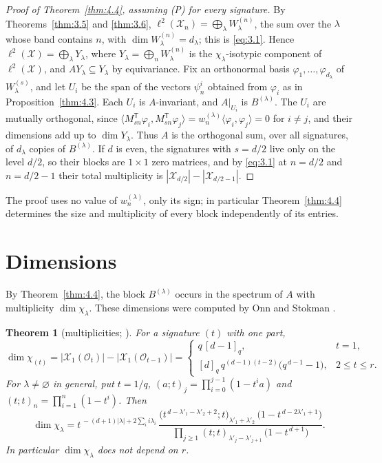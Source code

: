 \documentclass[11pt]{article}
\numberwithin{equation}{section}
\theoremstyle{plain}
\newtheorem{theorem}{Theorem}[section]
\theoremstyle{definition}
\begin{document}
\begin{proof}[Proof of Theorem~\ref{thm:4.4}, assuming (P) for every signature]
By Theorems~\ref{thm:3.5} and \ref{thm:3.6},
$\ell^2(\mathcal{X}_n)=\bigoplus_{\lambda}W^{(n)}_\lambda$, the sum over the $\lambda$ whose band
contains $n$, with $\dim W^{(n)}_\lambda=d_\lambda$; this is \eqref{eq:3.1}. Hence
$\ell^2(\mathcal{X})=\bigoplus_\lambda Y_\lambda$, where
$Y_\lambda=\bigoplus_nW^{(n)}_\lambda$ is the $\chi_\lambda$-isotypic component of
$\ell^2(\mathcal{X})$, and $AY_\lambda\subseteq Y_\lambda$ by equivariance. Fix an orthonormal
basis $\varphi_1,\dots,\varphi_{d_\lambda}$ of $W^{(s)}_\lambda$, and let $U_i$ be the
span of the vectors $\psi^i_n$ obtained from $\varphi_i$ as in Proposition~\ref{thm:4.3}. Each
$U_i$ is $A$-invariant, and $A|_{U_i}$ is $B^{(\lambda)}$. The $U_i$ are mutually
orthogonal, since
$\langle M_{sn}^{\mathsf T}\varphi_i,M_{sn}^{\mathsf T}\varphi_j\rangle=
w^{(\lambda)}_n\langle\varphi_i,\varphi_j\rangle=0$ for $i\ne j$, and their dimensions
add up to $\dim Y_\lambda$. Thus $A$ is the orthogonal sum, over all signatures, of
$d_\lambda$ copies of $B^{(\lambda)}$. If $d$ is even, the signatures with $s=d/2$ live
only on the level $d/2$, so their blocks are $1\times1$ zero matrices, and by \eqref{eq:3.1} at
$n=d/2$ and $n=d/2-1$ their total multiplicity is $|\mathcal{X}_{d/2}|-|\mathcal{X}_{d/2-1}|$.
\end{proof}

The proof uses no value of $w^{(\lambda)}_n$, only its sign; in particular Theorem~\ref{thm:4.4}
determines the size and multiplicity of every block independently of its entries.

\section{Dimensions}\label{sec:dims}

By Theorem~\ref{thm:4.4}, the block $B^{(\lambda)}$ occurs in the spectrum of $A$ with
multiplicity $\dim\chi_\lambda$. These dimensions were computed by Onn and Stokman \cite{OS06}.

\begin{theorem}[{multiplicities; \cite{OS06}}]\label{thm:5.1}
For a signature $(t)$ with one part,
\[
\dim\chi_{(t)}=|\mathcal{X}_1(\mathcal{O}_t)|-|\mathcal{X}_1(\mathcal{O}_{t-1})|
=\begin{cases}q\,[d-1]_q, & t=1,\\[2pt]
[d]_q\,q^{(d-1)(t-2)}\bigl(q^{\,d-1}-1\bigr), & 2\le t\le r.\end{cases}
\]
For $\lambda\ne\varnothing$ in general, put $t=1/q$, $(a;t)_j=\prod_{i=0}^{j-1}(1-t^{i}a)$ and $(t;t)_n=\prod_{i=1}^{n}(1-t^{i})$. Then
\[
\dim\chi_\lambda=t^{\,-(d+1)|\lambda|+2\sum_ii\lambda_i}\,
\frac{\bigl(t^{\,d-\lambda'_1-\lambda'_2+2};t\bigr)_{\lambda'_1+\lambda'_2}\,\bigl(1-t^{\,d-2\lambda'_1+1}\bigr)}
{\prod_{j\ge1}(t;t)_{\lambda'_j-\lambda'_{j+1}}\,\bigl(1-t^{\,d+1}\bigr)} .
\]
In particular $\dim\chi_\lambda$ does not depend on $r$.
\end{theorem}
\end{document}
